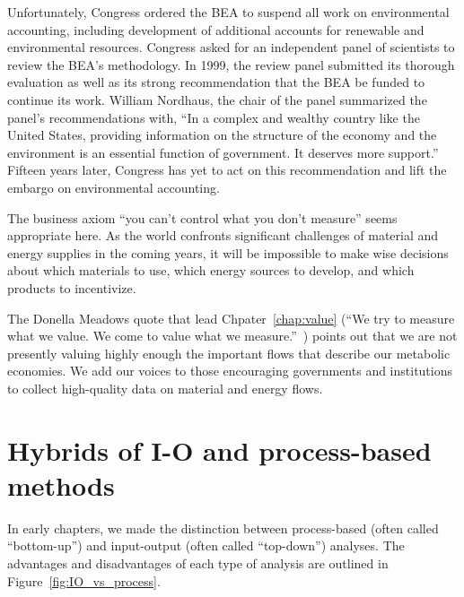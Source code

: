 Unfortunately, Congress ordered the BEA to suspend all work
on environmental accounting, including development of
additional accounts for renewable and environmental resources.  
Congress asked for an independent panel of scientists to review the BEA's methodology.
In 1999, the review panel submitted its thorough evaluation as well as its strong
recommendation that the BEA be funded to continue its work.\cite{Nordhaus1999a}
William Nordhaus,
the chair of the panel summarized the panel's recommendations with, 
``In a complex and wealthy country like the United States, 
providing information on the structure of the economy and the environment 
is an essential function of government. 
It deserves more support.''~\cite[p.~49]{Nordhaus:1999aa}
Fifteen years later, Congress has yet to act on this recommendation 
and lift the embargo on environmental accounting.

The business axiom ``you can't control what you don't measure''
seems appropriate here. 
As the world confronts significant challenges
of material and energy supplies in the coming years,
it will be impossible to make wise decisions about
which materials to use,
which energy sources to develop, and 
which products to incentivize.

The Donella Meadows quote that lead Chpater~\ref{chap:value}
(``We try to measure what we value. 
We come to value what we measure.''~\cite[p.~2]{Meadows:1998aa})
points out that we are not presently valuing highly enough
the important flows that describe our metabolic economies.
We add our voices to those encouraging governments and 
institutions to collect high-quality data on material 
and energy flows.


\section{Hybrids of I-O and process-based methods}
\label{sec:hybrid}

In early chapters,
we made the distinction between
process-based (often called ``bottom-up'') 
and input-output (often called ``top-down'')
analyses.
The advantages and disadvantages of each type
of analysis are outlined in Figure~\ref{fig:IO_vs_process}.

